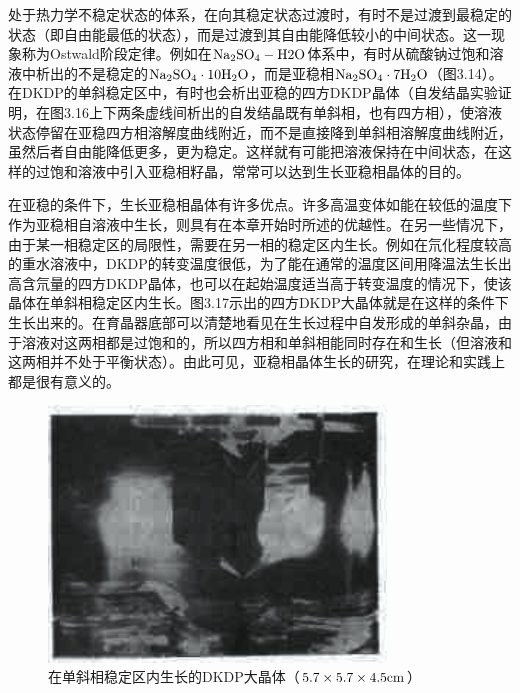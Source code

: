 处于热力学不稳定状态的体系，在向其稳定状态过渡时，有时不是过渡到最稳定的状态（即自由能最低的状态），而是过渡到其自由能降低较小的中间状态。这一现象称为Ostwald阶段定律。例如在$\rm Na_2SO_4-H2O$体系中，有时从硫酸钠过饱和溶液中析出的不是稳定的$\rm Na_2SO_4\cdot 10H_2O$，而是亚稳相$\rm Na_2SO_4\cdot 7H_2O$（图3.14）。在DKDP的单斜稳定区中，有时也会析出亚稳的四方DKDP晶体（自发结晶实验证明，在图3.16上下两条虚线间析出的自发结晶既有单斜相，也有四方相），使溶液状态停留在亚稳四方相溶解度曲线附近，而不是直接降到单斜相溶解度曲线附近，虽然后者自由能降低更多，更为稳定。这样就有可能把溶液保持在中间状态，在这样的过饱和溶液中引入亚稳相籽晶，常常可以达到生长亚稳相晶体的目的。

在亚稳的条件下，生长亚稳相晶体有许多优点。许多高温变体如能在较低的温度下作为亚稳相自溶液中生长，则具有在本章开始时所述的优越性。在另一些情况下，由于某一相稳定区的局限性，需要在另一相的稳定区内生长。例如在氘化程度较高的重水溶液中，DKDP的转变温度很低，为了能在通常的温度区间用降温法生长出高含氘量的四方DKDP晶体，也可以在起始温度适当高于转变温度的情况下，使该晶体在单斜相稳定区内生长。图3.17示出的四方DKDP大晶体就是在这样的条件下生长出来的。在育晶器底部可以清楚地看见在生长过程中自发形成的单斜杂晶，由于溶液对这两相都是过饱和的，所以四方相和单斜相能同时存在和生长（但溶液和这两相并不处于平衡状态）。由此可见，亚稳相晶体生长的研究，在理论和实践上都是很有意义的。

\begin{figure}[h]
 \centering
 \includegraphics[width=0.8\textwidth]{fig/cp03/img3.17.jpg}
 \caption{在单斜相稳定区内生长的DKDP大晶体（$\rm 5.7\times 5.7\times 4.5cm$）}
\end{figure}

